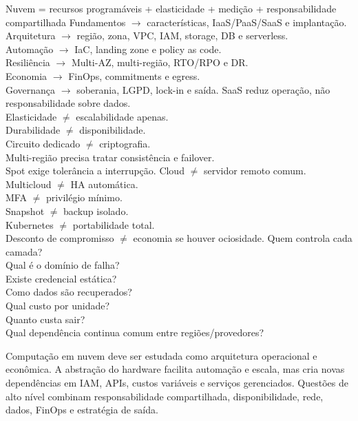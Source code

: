 {Nuvem = recursos programáveis + elasticidade + medição + responsabilidade compartilhada}
{Fundamentos $\rightarrow$ características, IaaS/PaaS/SaaS e implantação.\\Arquitetura $\rightarrow$ região, zona, VPC, IAM, storage, DB e serverless.\\Automação $\rightarrow$ IaC, landing zone e policy as code.\\Resiliência $\rightarrow$ Multi-AZ, multi-região, RTO/RPO e DR.\\Economia $\rightarrow$ FinOps, commitments e egress.\\Governança $\rightarrow$ soberania, LGPD, lock-in e saída.}
{SaaS reduz operação, não responsabilidade sobre dados.\\Elasticidade $\neq$ escalabilidade apenas.\\Durabilidade $\neq$ disponibilidade.\\Circuito dedicado $\neq$ criptografia.\\Multi-região precisa tratar consistência e failover.\\Spot exige tolerância a interrupção.}
{Cloud $\neq$ servidor remoto comum.\\Multicloud $\neq$ HA automática.\\MFA $\neq$ privilégio mínimo.\\Snapshot $\neq$ backup isolado.\\Kubernetes $\neq$ portabilidade total.\\Desconto de compromisso $\neq$ economia se houver ociosidade.}
{Quem controla cada camada?\\Qual é o domínio de falha?\\Existe credencial estática?\\Como dados são recuperados?\\Qual custo por unidade?\\Quanto custa sair?\\Qual dependência continua comum entre regiões/provedores?}

\begin{resumo}
Computação em nuvem deve ser estudada como arquitetura operacional e econômica. A abstração do hardware facilita automação e escala, mas cria novas dependências em IAM, APIs, custos variáveis e serviços gerenciados. Questões de alto nível combinam responsabilidade compartilhada, disponibilidade, rede, dados, FinOps e estratégia de saída.
\end{resumo}
